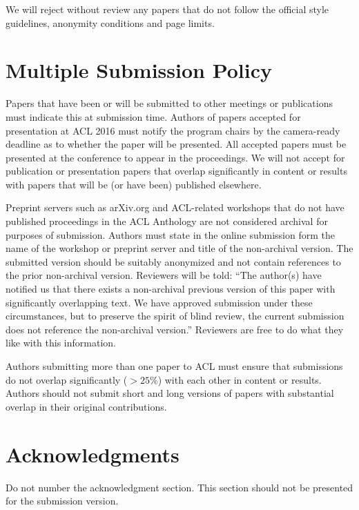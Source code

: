 \documentclass[11pt]{article}
\begin{document}
We will reject without review any papers that do not follow the
official style guidelines, anonymity conditions and page limits.

\section{Multiple Submission Policy}

Papers that have been or will be submitted to other meetings or
publications must indicate this at submission time. Authors of
papers accepted for presentation at ACL 2016 must notify the
program chairs by the camera-ready deadline as to whether the paper
will be presented. All accepted papers must be presented at the
conference to appear in the proceedings. We will not accept for
publication or presentation papers that overlap significantly in
content or results with papers that will be (or have been) published
elsewhere.

Preprint servers such as arXiv.org and ACL-related workshops that
do not have published proceedings in the ACL Anthology are not
considered archival for purposes of submission. Authors must state
in the online submission form the name of the workshop or preprint
server and title of the non-archival version.  The submitted version
should be suitably anonymized and not contain references to the
prior non-archival version. Reviewers will be told: ``The author(s)
have notified us that there exists a non-archival previous version
of this paper with significantly overlapping text. We have approved
submission under these circumstances, but to preserve the spirit
of blind review, the current submission does not reference the
non-archival version.'' Reviewers are free to do what they like with
this information.

Authors submitting more than one paper to ACL must ensure
that submissions do not overlap significantly ($>25\%$) with each other
in content or results. Authors should not submit short and long
versions of papers with substantial overlap in their original
contributions.

\section*{Acknowledgments}

Do not number the acknowledgment section.
This section should not be presented for the submission version.



\end{document}
